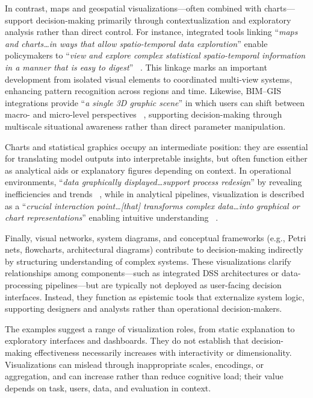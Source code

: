\documentclass{sfuthesis}
\begin{document}
In contrast, maps and geospatial visualizations—often combined with charts—support decision-making primarily through contextualization and exploratory analysis rather than direct control. For instance, integrated tools linking “\textit{maps and charts…in ways that allow spatio-temporal data exploration}” enable policymakers to “\textit{view and explore complex statistical spatio-temporal information in a manner that is easy to digest}” ~\cite{chorev2017data}. This linkage marks an important development from isolated visual elements to coordinated multi-view systems, enhancing pattern recognition across regions and time. Likewise, BIM–GIS integrations provide “\textit{a single 3D graphic scene}” in which users can shift between macro- and micro-level perspectives ~\cite{Ma2020EquipmentMaintenance}, supporting decision-making through multiscale situational awareness rather than direct parameter manipulation.\par
Charts and statistical graphics occupy an intermediate position: they are essential for translating model outputs into interpretable insights, but often function either as analytical aids or explanatory figures depending on context. In operational environments, “\textit{data graphically displayed…support process redesign}” by revealing inefficiencies and trends ~\cite{Dahl2022PathologyLaboratories}, while in analytical pipelines, visualization is described as a “\textit{crucial interaction point…[that] transforms complex data…into graphical or chart representations}” enabling intuitive understanding ~\cite{song2024building}.\par
Finally, visual networks, system diagrams, and conceptual frameworks (e.g., Petri nets, flowcharts, architectural diagrams) contribute to decision-making indirectly by structuring understanding of complex systems. These visualizations clarify relationships among components—such as integrated DSS architectures or data-processing pipelines—but are typically not deployed as user-facing decision interfaces. Instead, they function as epistemic tools that externalize system logic, supporting designers and analysts rather than operational decision-makers.\par
The examples suggest a range of visualization roles, from static explanation to exploratory interfaces and dashboards. They do not establish that decision-making effectiveness necessarily increases with interactivity or dimensionality. Visualizations can mislead through inappropriate scales, encodings, or aggregation, and can increase rather than reduce cognitive load; their value depends on task, users, data, and evaluation in context.
\end{document}
